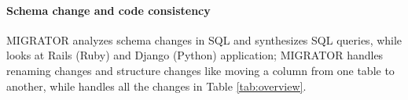  \paragraph{\bf Schema change and code consistency}  MIGRATOR
\cite{wang2019synthesizing} analyzes schema changes in SQL and synthesizes SQL queries,
while \ETool looks at Rails (Ruby) and Django (Python) application; MIGRATOR handles
renaming changes and structure changes like moving a column from one table to another,
while \ETool handles all the changes in Table \ref{tab:overview}.


\begin{comment}
1. Verification of constraints on DB schema change 
	— Synchronization of Queries and Views Upon Schema Evolutions: A Survey (3)
	— Generating Concise Entity Matching Rules (1)
	— Synthesizing Database Programs for Schema Refactoring (2)


2. Verification of data consistent with constraints
	— database test related work (Tao Xie, etc.)
	-- Guided Test Generation for Database Applications via Synthesized
Database Interactions (7)


3. Verification of web applications
	— A Verifier for Interactive, Data-driven Web Applications (verify chains of actions against spec)(wave)
	— Inductive verification of data model invariants in web
applications using first-order logic (invariants)
	— Verifying Equivalence of Database-Driven Applications
	— Rubicon: Bounded Verification of Web Applications

4. Constraints/verification for security/access control
	— Derailer: Interactive Security Analysis for Web Applications (verify what data might be exposed)
	— Finding Access Control Bugs in Web Applications with
CanCheck
	— Precise, dynamic information flow for database-backed applications
	— Verena: End-to-End Integrity Protection for Web Applications

5. Constraints for performance
	— Axiomatic Foundations and Algorithms for Deciding Semantic Equivalences of SQL Queries~\cite{chu2018axiomatic}

\end{comment}